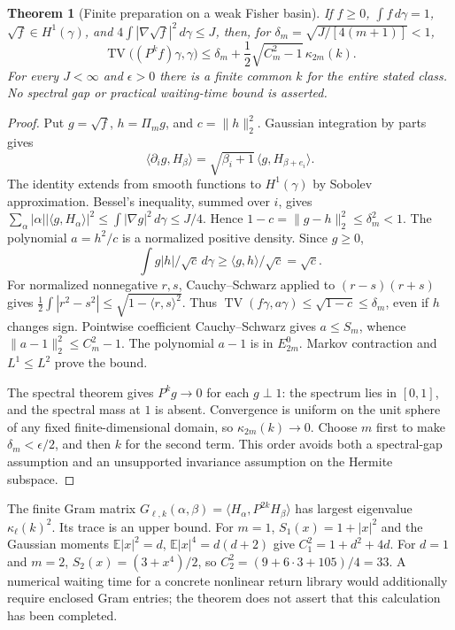 \documentclass[11pt]{article}
\numberwithin{equation}{section}
\newtheorem{theorem}{Theorem}[section]
\theoremstyle{definition}
\theoremstyle{remark}
\newcommand{\TV}{\operatorname{TV}}
\begin{document}
\begin{theorem}[Finite preparation on a weak Fisher basin]\label{thm:hermite}
If $f\ge0$, $\int f\,d\gamma=1$, $\sqrt f\in H^1(\gamma)$, and $4\int|\nabla\sqrt f|^2\,d\gamma\le J$, then, for $\delta_m=\sqrt{J/[4(m+1)]}<1$,
\[
 \TV\bigl((P^k f)\gamma,\gamma\bigr)
 \le\delta_m+\frac12\sqrt{C_m^2-1}\,\kappa_{2m}(k).
\]
For every $J<\infty$ and $\epsilon>0$ there is a finite common $k$ for the entire stated class. No spectral gap or practical waiting-time bound is asserted.
\end{theorem}
\begin{proof}
Put $g=\sqrt f$, $h=\Pi_mg$, and $c=\lVert h\rVert_2^2$. Gaussian integration by parts gives
\[
 \langle\partial_i g,H_\beta\rangle
 =\sqrt{\beta_i+1}\,\langle g,H_{\beta+e_i}\rangle.
\]
The identity extends from smooth functions to $H^1(\gamma)$ by Sobolev
approximation. Bessel's inequality, summed over $i$, gives
$\sum_\alpha|\alpha||\langle g,H_\alpha\rangle|^2
 \leq\int|\nabla g|^2\,d\gamma\leq J/4$. Hence $1-c=\lVert g-h\rVert_2^2\le\delta_m^2<1$. The polynomial $a=h^2/c$ is a normalized positive density. Since $g\ge0$,
\[
 \int g|h|/\sqrt c\,d\gamma\ge\langle g,h\rangle/\sqrt c=\sqrt c.
\]
For normalized nonnegative $r,s$, Cauchy--Schwarz applied to $(r-s)(r+s)$ gives $\frac12\int|r^2-s^2|\le\sqrt{1-\langle r,s\rangle^2}$. Thus $\TV(f\gamma,a\gamma)\le\sqrt{1-c}\le\delta_m$, even if $h$ changes sign. Pointwise coefficient Cauchy--Schwarz gives $a\le S_m$, whence $\lVert a-1\rVert_2^2\le C_m^2-1$. The polynomial $a-1$ is in $E_{2m}^0$. Markov contraction and $L^1\le L^2$ prove the bound.

The spectral theorem gives $P^kg\to0$ for each $g\perp1$: the spectrum lies in $[0,1]$, and the spectral mass at $1$ is absent. Convergence is uniform on the unit sphere of any fixed finite-dimensional domain, so $\kappa_{2m}(k)\to0$. Choose $m$ first to make $\delta_m<\epsilon/2$, and then $k$ for the second term. This order avoids both a spectral-gap assumption and an unsupported invariance assumption on the Hermite subspace.
\end{proof}

The finite Gram matrix $G_{\ell,k}(\alpha,\beta)=\langle H_\alpha,P^{2k}H_\beta\rangle$ has largest eigenvalue $\kappa_\ell(k)^2$. Its trace is an upper bound. For $m=1$, $S_1(x)=1+|x|^2$ and the Gaussian moments $\mathbb E|x|^2=d$, $\mathbb E|x|^4=d(d+2)$ give $C_1^2=1+d^2+4d$. For $d=1$ and $m=2$, $S_2(x)=(3+x^4)/2$, so $C_2^2=(9+6\cdot3+105)/4=33$. A numerical waiting time for a concrete nonlinear return library would additionally require enclosed Gram entries; the theorem does not assert that this calculation has been completed.
\end{document}
